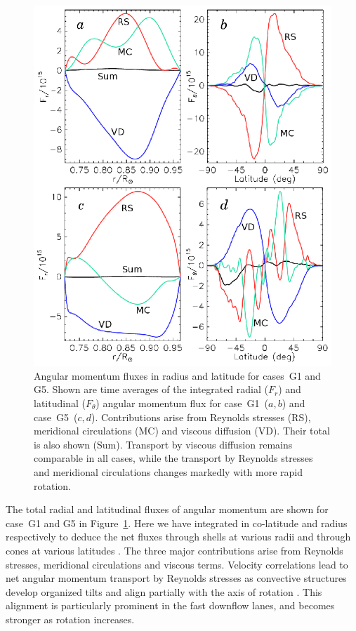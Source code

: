 \begin{figure}[htp]
  \begin{center}
    \includegraphics[width=0.7\linewidth]{figs/chapter_3/Figure_9.eps}
  \end{center}
  \caption[Angular momentum fluxes in radius and latitude for cases~G1 and G5]
  {Angular momentum fluxes in radius and latitude for cases~G1 and G5.
    Shown are time averages of the integrated radial ($F_r$) and latitudinal ($F_\theta$)
    angular momentum flux for case~G1~($a,b$) and case~G5~($c,d$).
    Contributions arise from Reynolds stresses (RS), meridional
    circulations (MC) and viscous diffusion (VD).  Their total is also
    shown (Sum).  Transport by viscous diffusion remains comparable in all cases,
    while the transport by Reynolds stresses and meridional circulations
    changes markedly with more rapid rotation.
  \label{fig:amom_balance}}
\end{figure}


The total radial and latitudinal fluxes of angular momentum are shown
for case~G1 and G5 in Figure~\ref{fig:amom_balance}.  Here we have
integrated in co-latitude and radius respectively to deduce the net
fluxes through shells at various radii and through cones at various
latitudes \citep[c.f.,][]{Miesch_2005}.  The three major contributions
arise from Reynolds stresses,  
meridional circulations and viscous terms.  Velocity correlations
lead to net angular momentum transport by Reynolds stresses as
convective structures develop organized tilts and align partially with
the axis of rotation
\citep[e.g.,][]{Brummell_et_al_1998,Brun&Toomre_2002, Miesch_et_al_2008}.  
This alignment is particularly prominent in the fast downflow lanes,
and becomes stronger as rotation increases.




